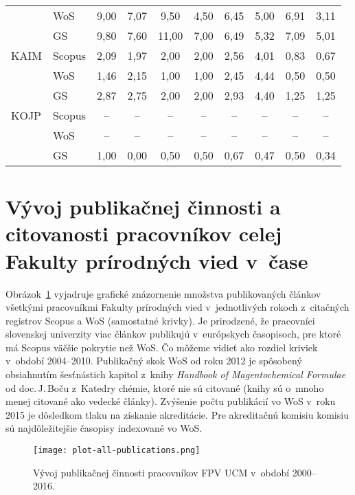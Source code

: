 \begin{table}
\begin{tabular}{llcccccccc}
      & WoS    & 9,00     & 7,07 & 9,50  & 4,50 & 6,45     & 5,00 & 6,91 & 3,11 \\
      & GS     & 9,80     & 7,60 & 11,00 & 7,00 & 6,49     & 5,32 & 7,09 & 5,01 \\[1ex]
 KAIM & Scopus & 2,09     & 1,97 & 2,00  & 2,00 & 2,56     & 4,01 & 0,83 & 0,67 \\
      & WoS    & 1,46     & 2,15 & 1,00  & 1,00 & 2,45     & 4,44 & 0,50 & 0,50 \\
      & GS     & 2,87     & 2,75 & 2,00  & 2,00 & 2,93     & 4,40 & 1,25 & 1,25 \\[1ex]
 KOJP & Scopus & --       & --   & --    & --   & --       & --   & --   & --   \\
      & WoS    & --       & --   & --    & --   & --       & --   & --   & --   \\
      & GS     & 1,00     & 0,00 & 0,50  & 0,50 & 0,67     & 0,47 & 0,50 & 0,34 \\[0.5ex]
  \bottomrule
\end{tabular}
\end{table}
\section{Vývoj publikačnej činnosti a citovanosti pracovníkov celej Fakulty
  prírodných vied v~čase}

Obrázok~\ref{fig:plot.all.publications} vyjadruje grafické znázornenie množstva
publikovaných článkov všetkými pracovníkmi Fakulty prírodných vied
v~jednotlivých rokoch z~citačných registrov Scopus a WoS (samostatné krivky).
Je prirodzené, že pracovníci slovenskej univerzity viac článkov publikujú
v~európskych časopisoch, pre ktoré má Scopus väčšie pokrytie než WoS.  Čo môžeme
vidieť ako rozdiel kriviek v~období 2004--2010.  Publikačný skok WoS od roku
2012 je spôsobený obsiahnutím šesťnástich kapitol z~knihy \emph{Handbook of
  Magentochemical Formulae} od doc.\,J.\,Boču z~Katedry chémie, ktoré nie sú
citované (knihy sú o~mnoho menej citované ako vedecké články).  Zvýšenie počtu
publikácií vo WoS v~roku 2015 je dôsledkom tlaku na získanie akreditácie.  Pre
akreditačnú komisiu komisiu sú najdôležitejšie časopisy indexované vo WoS.

\begin{figure}
  \centering
  \texttt{[image: plot-all-publications.png]}
  \caption{Vývoj publikačnej činnosti pracovníkov FPV UCM v~období 2000--2016.}
  \label{fig:plot.all.publications}
\end{figure}

